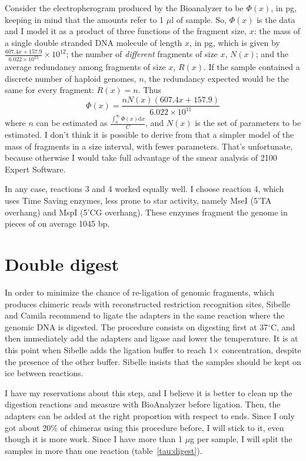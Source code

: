\documentclass[a4paper,12pt,twosided]{article}
\begin{document}
Consider the electropherogram produced by the Bioanalyzer to be $\Phi(x)$, in pg, keeping in mind that the amounts refer to 1 $\mu$l of sample. So, $\Phi(x)$ is the data and I model it as a product of three functions of the fragment size, $x$: the mass of a single double stranded DNA molecule of length $x$, in pg, which is given by $\frac{607.4x + 157.9}{6.022\times 10^{23}}\times 10^{12}$; the number of \emph{different} fragments of size $x$, $N(x)$; and the average redundancy among fragments of size $x$, $R(x)$. If the sample contained a discrete number of haploid genomes, $n$, the redundancy expected would be the same for every fragment: $R(x) = n$. Thus
\begin{equation}
\Phi(x) = \frac{nN(x)(607.4x+157.9)}{6.022\times 10^{11}}
\end{equation}
where $n$ can be estimated as $\frac{\int_0^{\infty} \Phi(x)\mathrm{d}x}{C}$, and $N(x)$ is the set of parameters to be estimated. I don't think it is possible to derive from that a simpler model of the mass of fragments in a size interval, with fewer parameters. That's unfortunate, because otherwise I would take full advantage of the smear analysis of 2100 Expert Software.

In any case, reactions 3 and 4 worked equally well. I choose reaction 4, which uses Time Saving enzymes, less prone to star activity, namely MseI (5'TA overhang) and MspI (5'CG overhang). These enzymes fragment the genome in pieces of on average 1045 bp, 

\section{Double digest}
In order to minimize the chance of re-ligation of genomic fragments, which produces chimeric reads with reconstructed restriction recognition sites, Sibelle and Camila recommend to ligate the adapters in the same reaction where the genomic DNA is digested. The procedure consists on digesting first at 37$^{\circ}$C, and then immediately add the adapters and ligase and lower the temperature. It is at this point when Sibelle adds the ligation buffer to reach 1$\times$ concentration, despite the presence of the other buffer. Sibelle insists that the samples should be kept on ice between reactions. 

I have my reservations about this step, and I believe it is better to clean up the digestion reactions and measure with BioAnalyzer before ligation. Then, the adapters can be added at the right proportion with respect to ends. Since I only got about 20\% of chimeras using this procedure before, I will stick to it, even though it is more work. Since I have more than 1 $\mu$g per sample, I will split the samples in more than one reaction (table~\ref{tau:digest}).
\end{document}
